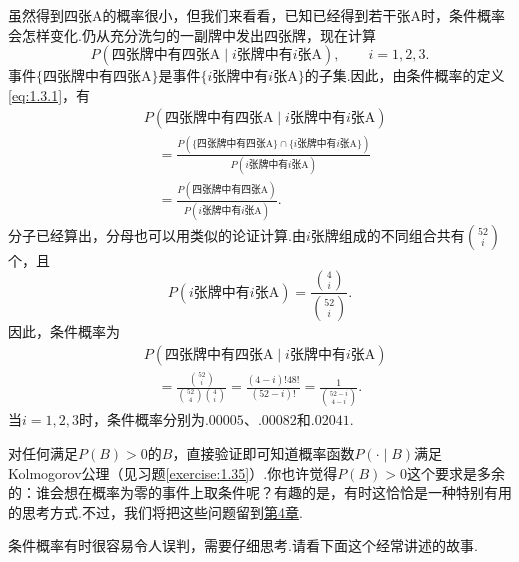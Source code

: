 \begin{example}[续例\ref{ex:1.3.1}]\label{ex:1.3.3}
虽然得到四张A的概率很小，但我们来看看，已知已经得到若干张A时，条件概率会怎样变化.仍从充分洗匀的一副牌中发出四张牌，现在计算
$$P(\text{四张牌中有四张A}\mid\text{$i$张牌中有$i$张A}),\qquad i=1,2,3.$$
事件$\{\text{四张牌中有四张A}\}$是事件$\{\text{$i$张牌中有$i$张A}\}$的子集.因此，由条件概率的定义\eqref{eq:1.3.1}，有
\begin{equation*}
\begin{aligned}
&P(\text{四张牌中有四张A}\mid\text{$i$张牌中有$i$张A})\\
&\quad=\frac{P(\{\text{四张牌中有四张A}\}\cap\{\text{$i$张牌中有$i$张A}\})}{P(\text{$i$张牌中有$i$张A})}\\
&\quad=\frac{P(\text{四张牌中有四张A})}{P(\text{$i$张牌中有$i$张A})}.
\end{aligned}
\end{equation*}
分子已经算出，分母也可以用类似的论证计算.由$i$张牌组成的不同组合共有$\binom{52}{i}$个，且
$$P(\text{$i$张牌中有$i$张A})=\frac{\binom4i}{\binom{52}i}.$$
因此，条件概率为
\begin{equation*}
\begin{aligned}
&P(\text{四张牌中有四张A}\mid\text{$i$张牌中有$i$张A})\\
&\quad=\frac{\binom{52}i}{\binom{52}4\binom4i}
=\frac{(4-i)!48!}{(52-i)!}=\frac1{\binom{52-i}{4-i}}.
\end{aligned}
\end{equation*}
当$i=1,2,3$时，条件概率分别为$.00005$、$.00082$和$.02041$.
\end{example}

对任何满足$P(B)>0$的$B$，直接验证即可知道概率函数$P(\cdot\mid B)$满足Kolmogorov公理（见习题\ref{exercise:1.35}）.你也许觉得$P(B)>0$这个要求是多余的：谁会想在概率为零的事件上取条件呢？有趣的是，有时这恰恰是一种特别有用的思考方式.不过，我们将把这些问题留到\hyperref[sec:4]{第4章}.

条件概率有时很容易令人误判，需要仔细思考.请看下面这个经常讲述的故事.


